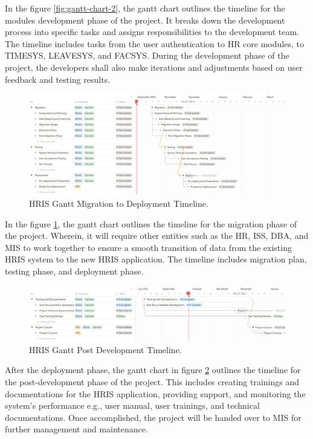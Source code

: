     In the figure \ref{fig:gantt-chart-2}, the gantt chart outlines the timeline for the modules development phase of the project. It breaks down the development process into specific tasks and assigns responsibilities to the development team. The timeline includes tasks from the user authentication to HR core modules, to TIMESYS, LEAVESYS, and FACSYS. During the development phase of the project, the developers shall also make iterations and adjustments based on user feedback and testing results.

    \begin{figure}[H]
        \centering
        \includegraphics[width=1\linewidth]{figures/images/diagrams/gantt/gantt-chart-3.png}
        \caption{HRIS Gantt Migration to Deployment Timeline.}
        \label{fig:gantt-chart-3}
    \end{figure}

    In the figure \ref{fig:gantt-chart-3}, the gantt chart outlines the timeline for the migration phase of the project. Wherein, it will require other entities such as the HR, ISS, DBA, and MIS to work together to ensure a smooth transition of data from the existing HRIS system to the new HRIS application. The timeline includes migration plan, testing phase, and deployment phase.

    \begin{figure}[H]
        \centering
        \includegraphics[width=1\linewidth]{figures/images/diagrams/gantt/gantt-chart-4.png}
        \caption{HRIS Gantt Post Development Timeline.}
        \label{fig:gantt-chart-4}
    \end{figure}

    After the deployment phase, the gantt chart in figure \ref{fig:gantt-chart-4} outlines the timeline for the post-development phase of the project. This includes creating trainings and documentations for the HRIS application, providing support, and monitoring the system's performance e.g., user manual, user trainings, and technical documentations. Once accomplished, the project will be handed over to MIS for further management and maintenance.

